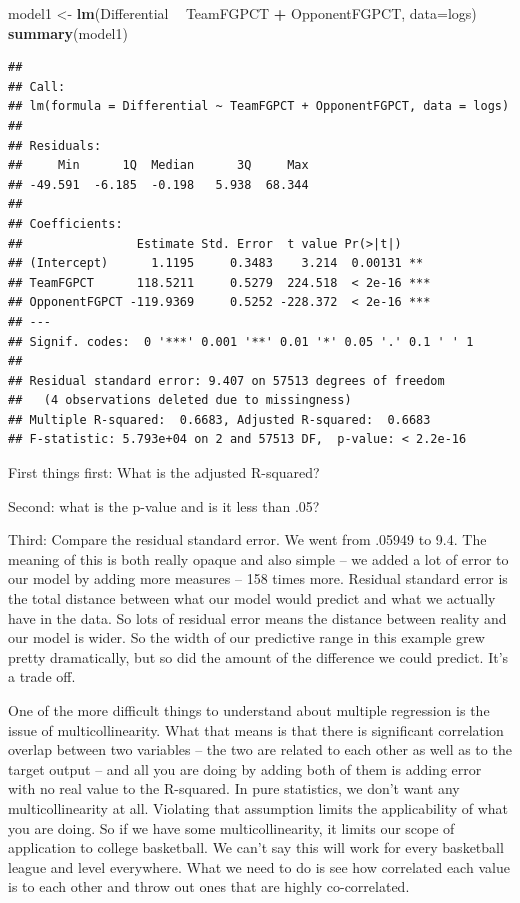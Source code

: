 \documentclass[
]{book}
\newenvironment{Shaded}{\begin{snugshade}}{\end{snugshade}}
\newcommand{\DataTypeTok}[1]{\textcolor[rgb]{0.13,0.29,0.53}{#1}}
\newcommand{\KeywordTok}[1]{\textcolor[rgb]{0.13,0.29,0.53}{\textbf{#1}}}
\newcommand{\NormalTok}[1]{#1}
\newcommand{\OperatorTok}[1]{\textcolor[rgb]{0.81,0.36,0.00}{\textbf{#1}}}
\newcommand{\StringTok}[1]{\textcolor[rgb]{0.31,0.60,0.02}{#1}}
\begin{document}
\begin{Shaded}
\begin{Highlighting}[]
\NormalTok{model1 <-}\StringTok{ }\KeywordTok{lm}\NormalTok{(Differential }\OperatorTok{~}\StringTok{ }\NormalTok{TeamFGPCT }\OperatorTok{+}\StringTok{ }\NormalTok{OpponentFGPCT, }\DataTypeTok{data=}\NormalTok{logs)}
\KeywordTok{summary}\NormalTok{(model1)}
\end{Highlighting}
\end{Shaded}

\begin{verbatim}
## 
## Call:
## lm(formula = Differential ~ TeamFGPCT + OpponentFGPCT, data = logs)
## 
## Residuals:
##     Min      1Q  Median      3Q     Max 
## -49.591  -6.185  -0.198   5.938  68.344 
## 
## Coefficients:
##                Estimate Std. Error  t value Pr(>|t|)    
## (Intercept)      1.1195     0.3483    3.214  0.00131 ** 
## TeamFGPCT      118.5211     0.5279  224.518  < 2e-16 ***
## OpponentFGPCT -119.9369     0.5252 -228.372  < 2e-16 ***
## ---
## Signif. codes:  0 '***' 0.001 '**' 0.01 '*' 0.05 '.' 0.1 ' ' 1
## 
## Residual standard error: 9.407 on 57513 degrees of freedom
##   (4 observations deleted due to missingness)
## Multiple R-squared:  0.6683,	Adjusted R-squared:  0.6683 
## F-statistic: 5.793e+04 on 2 and 57513 DF,  p-value: < 2.2e-16
\end{verbatim}

First things first: What is the adjusted R-squared?

Second: what is the p-value and is it less than .05?

Third: Compare the residual standard error. We went from .05949 to 9.4. The meaning of this is both really opaque and also simple -- we added a lot of error to our model by adding more measures -- 158 times more. Residual standard error is the total distance between what our model would predict and what we actually have in the data. So lots of residual error means the distance between reality and our model is wider. So the width of our predictive range in this example grew pretty dramatically, but so did the amount of the difference we could predict. It's a trade off.

One of the more difficult things to understand about multiple regression is the issue of multicollinearity. What that means is that there is significant correlation overlap between two variables -- the two are related to each other as well as to the target output -- and all you are doing by adding both of them is adding error with no real value to the R-squared. In pure statistics, we don't want any multicollinearity at all. Violating that assumption limits the applicability of what you are doing. So if we have some multicollinearity, it limits our scope of application to college basketball. We can't say this will work for every basketball league and level everywhere. What we need to do is see how correlated each value is to each other and throw out ones that are highly co-correlated.
\end{document}
